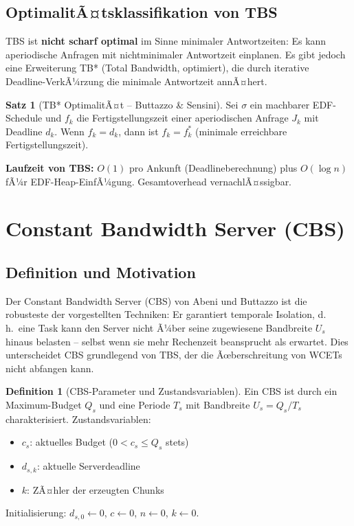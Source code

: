 ﻿\documentclass[a4paper,12pt]{report}
\theoremstyle{definition}
\newtheorem{definition}{Definition}[chapter]
\newtheorem{satz}{Satz}[chapter]
\begin{document}
\subsection{OptimalitÃ¤tsklassifikation von TBS}

TBS ist \textbf{nicht scharf optimal} im Sinne minimaler Antwortzeiten: Es kann
aperiodische Anfragen mit nichtminimaler Antwortzeit einplanen. Es gibt jedoch
eine Erweiterung TB* (Total Bandwidth, optimiert), die durch iterative Deadline-VerkÃ¼rzung die minimale Antwortzeit annÃ¤hert.

\begin{satz}[TB* OptimalitÃ¤t -- Buttazzo \& Sensini]
	Sei $\sigma$ ein machbarer EDF-Schedule und $f_k$ die Fertigstellungszeit
	einer aperiodischen Anfrage $J_k$ mit Deadline $d_k$. Wenn $f_k = d_k$, dann
	ist $f_k = f_k^*$ (minimale erreichbare Fertigstellungszeit).
\end{satz}

\textbf{Laufzeit von TBS:} $O(1)$ pro Ankunft (Deadlineberechnung) plus $O(\log n)$
fÃ¼r EDF-Heap-EinfÃ¼gung. Gesamtoverhead vernachlÃ¤ssigbar.

\section{Constant Bandwidth Server (CBS)}

\subsection{Definition und Motivation}

Der Constant Bandwidth Server (CBS) von Abeni und Buttazzo \cite{Buttazzo2011}
ist die robusteste der vorgestellten Techniken: Er garantiert temporale Isolation,
d.\,h.\ eine Task kann den Server nicht Ã¼ber seine zugewiesene Bandbreite $U_s$
hinaus belasten -- selbst wenn sie mehr Rechenzeit beansprucht als erwartet.
Dies unterscheidet CBS grundlegend von TBS, der die Ãœberschreitung von WCETs
nicht abfangen kann.

\begin{definition}[CBS-Parameter und Zustandsvariablen]
	Ein CBS ist durch ein Maximum-Budget $Q_s$ und eine Periode $T_s$ mit
	Bandbreite $U_s = Q_s/T_s$ charakterisiert. Zustandsvariablen:
	\begin{itemize}
		\item $c_s$: aktuelles Budget ($0 < c_s \leq Q_s$ stets)
		\item $d_{s,k}$: aktuelle Serverdeadline
		\item $k$: ZÃ¤hler der erzeugten Chunks
	\end{itemize}
	Initialisierung: $d_{s,0} \leftarrow 0$, $c \leftarrow 0$, $n \leftarrow 0$, $k \leftarrow 0$.
\end{definition}
\end{document}
